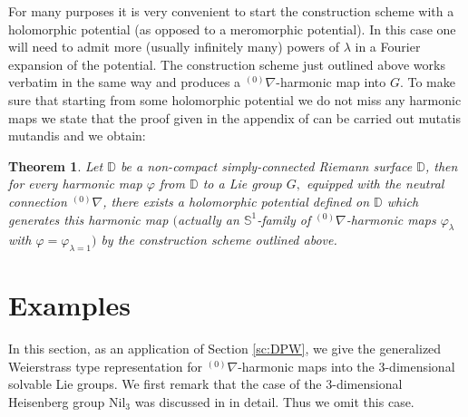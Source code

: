 \documentclass[12pt]{amsart}
\newtheorem{Theorem}{Theorem}[section]
\theoremstyle{definition}
\theoremstyle{remark}
\numberwithin{equation}{section}
\begin{document}
 For many purposes it is very convenient to start the construction scheme with 
 a holomorphic potential (as opposed to a meromorphic potential).
 In this case one will need to admit more (usually infinitely many) powers of 
 $\lambda$ in a Fourier expansion of the potential. The construction scheme just outlined 
 above works verbatim in the same way
 and produces a ${{}^{(0)}\nabla}$-harmonic map into $G$.
 To make sure that starting from some holomorphic potential we do not miss 
 any harmonic maps we state that the proof given in the appendix of \cite{DPW}
 can be carried out mutatis mutandis and we obtain:
\begin{Theorem}
 Let $\mathbb{D}$ be a non-compact simply-connected Riemann surface ${\mathbb D}$, 
 then for every harmonic map $\varphi$
 from $\mathbb{D}$ to a Lie group $G,$
 equipped with the neutral connection ${{}^{(0)}\nabla}$, 
 there exists a holomorphic potential defined on $\mathbb{D}$
 which generates this harmonic map $($actually an 
 $\mathbb S^1$-family of ${{}^{(0)}\nabla}$-harmonic 
 maps $\varphi_{\lambda}$ with  $\varphi = \varphi_{\lambda =1}$$)$
 by the construction scheme outlined above.
\end{Theorem}
\section{Examples}\label{sc:Examples}
 In this section, as an application of Section \ref{sc:DPW}, 
 we give the generalized Weierstrass type representation for 
 ${{}^{(0)}\nabla}$-harmonic maps into the $3$-dimensional solvable Lie groups. 
 We first remark that 
 the case of the $3$-dimensional Heisenberg group $\mathrm{Nil}_3$ 
 was discussed in \cite{BD} in detail. 
 Thus we omit this case.
\end{document}
